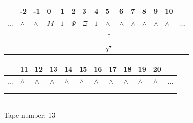 \documentclass[11pt]{article}
\begin{document}
\begin{table}[H]
\centering
\begin{tabular}{lllllllllllllll}
 & -2 & -1 & 0 & 1 & 2 & 3 & 4 & 5 & 6 & 7 & 8 & 9 & 10 & \\
\hline
$...$ & \multicolumn{1}{|l|}{$\wedge$} & \multicolumn{1}{|l|}{$\wedge$} & \multicolumn{1}{|l|}{$M$} & \multicolumn{1}{|l|}{$1$} & \multicolumn{1}{|l|}{$\Psi$} & \multicolumn{1}{|l|}{$\Xi$} & \multicolumn{1}{|l|}{$1$} & \multicolumn{1}{|l|}{$\wedge$} & \multicolumn{1}{|l|}{$\wedge$} & \multicolumn{1}{|l|}{$\wedge$} & \multicolumn{1}{|l|}{$\wedge$} & \multicolumn{1}{|l|}{$\wedge$} & \multicolumn{1}{|l|}{$\wedge$} & $...$\\
\hline
&  &  &  &  &  &  &  & $\uparrow$ &  &  &  &  &  &  \\
&  &  &  &  &  &  &  & $ q7 $ &  &  &  &  &  &  \\
\end{tabular}
\begin{tabular}{llllllllllll}
 & 11 & 12 & 13 & 14 & 15 & 16 & 17 & 18 & 19 & 20 & \\
\hline
$...$ & \multicolumn{1}{|l|}{$\wedge$} & \multicolumn{1}{|l|}{$\wedge$} & \multicolumn{1}{|l|}{$\wedge$} & \multicolumn{1}{|l|}{$\wedge$} & \multicolumn{1}{|l|}{$\wedge$} & \multicolumn{1}{|l|}{$\wedge$} & \multicolumn{1}{|l|}{$\wedge$} & \multicolumn{1}{|l|}{$\wedge$} & \multicolumn{1}{|l|}{$\wedge$} & \multicolumn{1}{|l|}{$\wedge$} & $...$\\
\hline
&  &  &  &  &  &  &  &  &  &  &  \\
&  &  &  &  &  &  &  &  &  &  &  \\
\end{tabular}
\\
Tape number: 13
\noindent\makebox[\linewidth]{\hdashrule{\textwidth}{1pt}{1pt}}\end{table}
\end{document}
